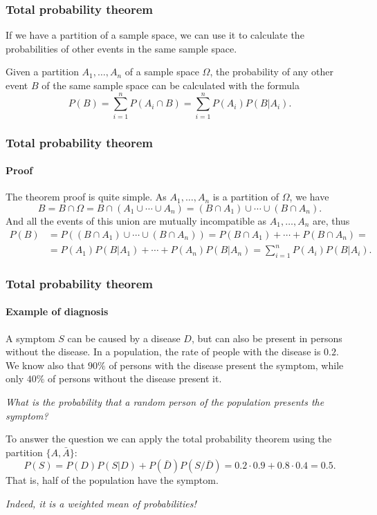 \begin{frame}
\frametitle{Total probability theorem}
If we have a partition of a sample space, we can use it to calculate the probabilities of other events in the same
sample space.
\begin{theorem}
Given a partition $A_1,\ldots,A_n$ of a sample space $\Omega$, the probability of any other event $B$ of the same sample
space can be calculated with the formula
\[
P(B) = \sum_{i=1}^n P(A_i\cap B) = \sum_{i=1}^n P(A_i)P(B|A_i).
\]
\end{theorem}
\end{frame}


\begin{frame}
\frametitle{Total probability theorem}
\framesubtitle{Proof}
The theorem proof is quite simple.
As $A_1,\ldots,A_n$ is a partition of $\Omega$, we have 
\[
B = B\cap \Omega = B\cap (A_1\cup \cdots \cup A_n) = (B\cap A_1)\cup \cdots \cup (B\cap A_n).
\]
And all the events of this union are mutually incompatible as $A_1,\ldots,A_n$ are, thus
\begin{align*}
P(B) &= P((B\cap A_1)\cup \cdots \cup (B\cap A_n)) = P(B\cap A_1)+\cdots + P(B\cap A_n) =\\
&= P(A_1)P(B|A_1)+\cdots + P(A_n)P(B|A_n) = \sum_{i=1}^n P(A_i)P(B|A_i).
\end{align*}

\begin{center}

\end{center}
\end{frame}


\begin{frame}
\frametitle{Total probability theorem}
\framesubtitle{Example of diagnosis}
A symptom $S$ can be caused by a disease $D$, but can also be present in persons without the disease.
In a population, the rate of people with the disease is $0.2$. 
We know also that $90\%$ of persons with the disease present the symptom, while only $40\%$ of persons without the
disease present it. 

\emph{What is the probability that a random person of the population presents the symptom?}

To answer the question we can apply the total probability theorem using the partition $\{A,\bar A\}$:
\[
P(S) = P(D)P(S|D)+P(\bar D)P(S/\bar D) = 0.2\cdot 0.9 + 0.8\cdot 0.4 = 0.5.
\]
That is, half of the population have the symptom. 

\begin{center}
\emph{Indeed, it is a weighted mean of probabilities!}
\end{center}
\end{frame}


